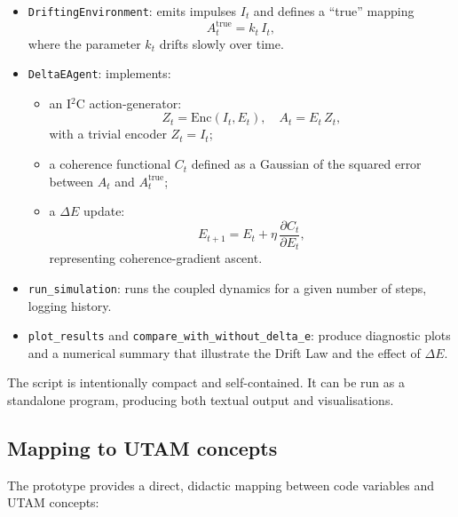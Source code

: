 \documentclass[12pt,a4paper]{report}
\begin{document}
\begin{itemize}[leftmargin=2em]
    \item \texttt{DriftingEnvironment}: emits impulses \(I_t\) and defines a ``true'' mapping
    \[
        A^{\mathrm{true}}_t = k_t \, I_t,
    \]
    where the parameter \(k_t\) drifts slowly over time.
    \item \texttt{DeltaEAgent}: implements:
    \begin{itemize}
        \item an I$^2$C action-generator:
        \[
            Z_t = \mathrm{Enc}(I_t, E_t), \quad A_t = E_t \, Z_t,
        \]
        with a trivial encoder \(Z_t = I_t\);
        \item a coherence functional \(C_t\) defined as a Gaussian of the squared error between \(A_t\) and \(A_t^{\mathrm{true}}\);
        \item a $\Delta E$ update:
        \[
            E_{t+1} = E_t + \eta \, \frac{\partial C_t}{\partial E_t},
        \]
        representing coherence-gradient ascent.
    \end{itemize}
    \item \texttt{run\_simulation}: runs the coupled dynamics for a given number of steps, logging history.
    \item \texttt{plot\_results} and \texttt{compare\_with\_without\_delta\_e}: produce diagnostic plots and a numerical summary that illustrate the Drift Law and the effect of $\Delta E$.
\end{itemize}

The script is intentionally compact and self-contained. It can be run as a standalone program, producing both textual output and visualisations.

\subsection*{Mapping to UTAM concepts}

The prototype provides a direct, didactic mapping between code variables and UTAM concepts:
\end{document}
